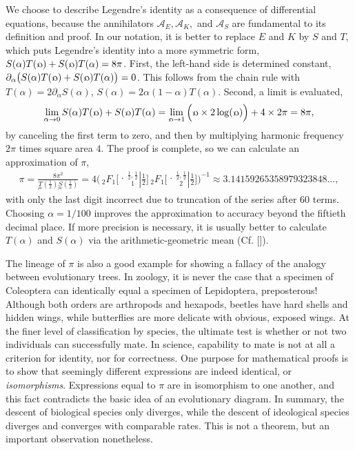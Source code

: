 \documentclass[nofootinbib,preprint]{revtex4-1}
\newcommand{\tFo}[3]{\,_2F_1 \bigg[ 
\genfrac.|{0pt}{}{#1}{#2} #3 \bigg]}
\newcommand{\rev}[1]{\text{\reflectbox{$#1$}}}
\begin{document}
We choose to describe Legendre's identity as a consequence of differential equations, 
because the annihilators $\mathcal{A}_E, \mathcal{A}_K,$ and $\mathcal{A}_S$
are fundamental to its definition and proof. In our notation, it is better to replace
$E$ and $K$ by $S$ and $T$, which puts Legendre's identity into a more symmetric 
form,  $S(\alpha)T(\rev{\alpha})+S(\rev{\alpha})T(\alpha)=8\pi$. First, the 
left-hand side is determined constant,
$\partial_{\alpha}\big(S(\alpha)T(\rev{\alpha})+S(\rev{\alpha})T(\alpha)\big)=0$.
This follows from the chain rule with $T(\alpha) = 2\partial_{\alpha}S(\alpha)$,
$S(\alpha)= 2\alpha(1-\alpha)T(\alpha)$. Second, a limit is evaluated,
\begin{eqnarray}
\lim_{\alpha \rightarrow 0} S(\alpha)T(\rev{\alpha})+S(\rev{\alpha})T(\alpha)
= \lim_{\rev{\alpha} \rightarrow 1} \Big(\rev{\alpha} \times 2 \log(\rev{\alpha}) \Big)  + 4 \times  2\pi = 8\pi,  
\nonumber
\end{eqnarray} 
by canceling the first term to zero, and then by multiplying harmonic frequency
$2\pi$ times square area $4$. The proof is complete, so we can calculate an 
approximation of $\pi$, 
\begin{eqnarray}
\pi = \frac{8\pi^2}{\underset{^{pw}}{T}(\tfrac{1}{2})\underset{^{pw}}{S}(\tfrac{1}{2})}
=4 \bigg(\tFo{\frac{1}{2},\frac{1}{2}}{1}{\frac{1}{2}} \tFo{\frac{1}{2},\frac{1}{2}}{2}{\frac{1}{2}} \bigg)^{-1}
\approx 3.14159265358979323848..., \nonumber
\end{eqnarray}
with only the last digit incorrect due to truncation of the series after $60$ terms. 
Choosing ${\alpha = 1/100}$ improves the approximation to accuracy beyond the fiftieth 
decimal place. If more precision is necessary, it is usually better to calculate $T(\alpha)$ 
and $S(\alpha)$ via the arithmetic-geometric mean (Cf. []). 

The lineage of $\pi$ is also a good example for showing a fallacy of the analogy 
between evolutionary trees. In zoology, it is never the case that a specimen of Coleoptera
can identically equal a specimen of Lepidoptera, preposterous! Although both orders 
are arthropods and hexapods, beetles have hard shells and hidden wings, while butterflies 
are more delicate with obvious, exposed wings. At the finer level of classification by 
species, the ultimate test is whether or not two individuals can successfully mate. 
In science, capability to mate is not at all a criterion for identity, nor for correctness. 
One purpose for mathematical proofs is to show that seemingly different expressions are 
indeed identical, or \textit{isomorphisms}. Expressions equal to $\pi$ are in isomorphism 
to one another, and this fact contradicts the basic idea of an evolutionary diagram. 
In summary, the descent of biological species only diverges, while the descent of ideological 
species diverges and converges with comparable rates. This is not a theorem, but
an important observation nonetheless.
\end{document}
